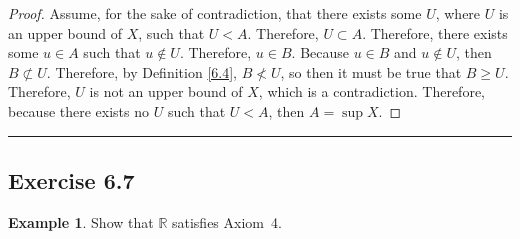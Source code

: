 \documentclass[openany, amssymb, psamsfonts]{amsart}
\newcommand{\bbR}{\mathbb{R}}
\theoremstyle{definition}
\newtheorem{exmp}{Example}[section]
\numberwithin{equation}{section}
\begin{document}
\begin{proof}
Assume, for the sake of contradiction, that there exists some $U$, where $U$ is an upper bound of $X$, such that $U<A$. Therefore, $U\subset A$. Therefore, there exists some $u\in A$ such that $u\notin U$. Therefore, $u\in B$. Because $u\in B$ and $u\notin U$, then $B\not\subset U$. Therefore, by Definition \ref{6.4}, $B\not< U$, so then it must be true that $B\geq U$. Therefore, $U$ is not an upper bound of $X$, which is a contradiction. Therefore, because there exists no $U$ such that $U<A$, then $A = \sup X$.
\end{proof} \vspace{4pt}     \hrule   \vspace{4pt}

\subsection*{Exercise 6.7}
\begin{exmp}
\label{6.7}
Show that $\bbR$ satisfies Axiom~4.
\end{exmp}
\end{document}
